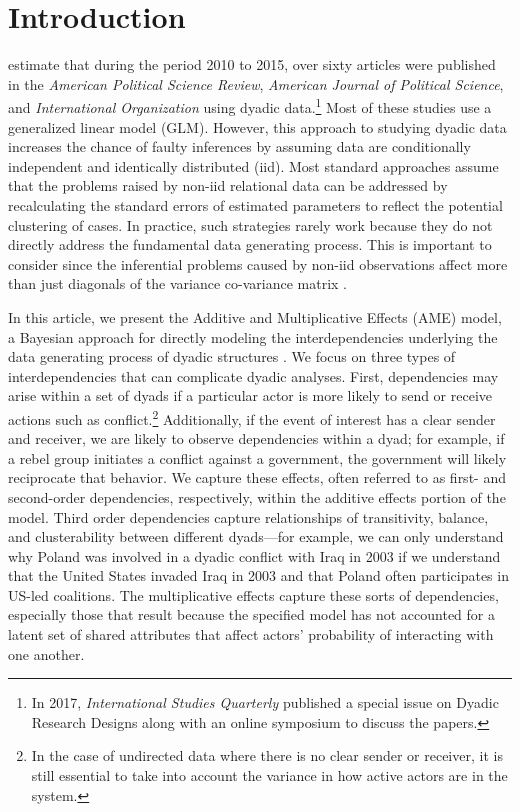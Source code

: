 \section{\textbf{Introduction}}

\citet{aronow:etal:2015} estimate that during the period 2010 to 2015, over sixty articles were published in the \textit{American Political Science Review}, \textit{American Journal of Political Science}, and \textit{International Organization} using dyadic data.\footnote{In 2017, \textit{International Studies Quarterly} published a special issue on Dyadic Research Designs along with an online symposium to discuss the papers.} Most of these studies use a generalized linear model (GLM).  However, this approach to studying dyadic data increases the chance of faulty inferences by assuming data are conditionally independent and identically distributed (iid). Most standard approaches assume that the problems raised by non-iid relational data can be addressed by recalculating the standard errors of estimated parameters to reflect the potential clustering of cases. In practice, such strategies rarely work because they do not directly address the fundamental data generating process. This is important to consider since the inferential problems caused by non-iid  observations affect more than just diagonals of the variance co-variance matrix \citep{beck:2012,franzese:hayes:2007,king:roberts:2014}.

In this article, we present the Additive and Multiplicative Effects (AME) model, a Bayesian approach for directly modeling the interdependencies underlying the data generating process of dyadic structures \citep{hoff:2008,minhas:etal:2016:arxiv}. We focus on three types of interdependencies that can complicate dyadic analyses. First, dependencies may arise within a set of dyads if a particular actor is more likely to send or receive actions such as conflict.\footnote{In the case of undirected data where there is no clear sender or receiver, it is still essential to take into account the variance in how active actors are in the system.} Additionally, if the event of interest has a clear sender and receiver, we are likely to observe dependencies within a dyad; for example, if a rebel group initiates a conflict against a government, the government will likely reciprocate that behavior. We capture these effects, often referred to as first- and second-order dependencies, respectively, within the additive effects portion of the model. Third order dependencies capture relationships of transitivity, balance, and clusterability between different dyads---for example, we can only understand why Poland was involved in a dyadic conflict with Iraq in 2003 if we understand that the United States invaded Iraq in 2003 and that Poland often participates in US-led coalitions. The multiplicative effects capture these sorts of dependencies, especially those that result because the specified model has not accounted for a latent set of shared attributes that affect actors' probability of interacting with one another.  

